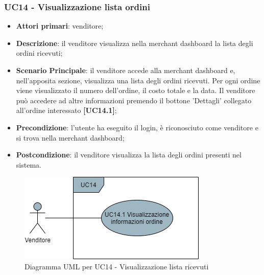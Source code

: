 \subsubsection{UC14 - Visualizzazione lista ordini}
\begin{itemize}
\item \textbf{Attori primari}: venditore;
\item \textbf{Descrizione}: il venditore visualizza nella merchant dashboard la lista degli ordini ricevuti;
\item \textbf{Scenario Principale}: il venditore accede alla merchant dashboard e, nell'apposita sezione, visualizza una lista degli ordini ricevuti. Per ogni ordine viene visualizzato il numero dell'ordine, il costo totale e la data. Il venditore può accedere ad altre informazioni premendo il bottone 'Dettagli' collegato all'ordine interessato \textbf{[UC14.1]};
\item \textbf{Precondizione}: l'utente ha eseguito il login, è riconosciuto come venditore e si trova nella merchant dashboard;
\item \textbf{Postcondizione}: il venditore visualizza la lista degli ordini presenti nel sistema.
\end{itemize}

\begin{figure}[H]
\centering
\includegraphics[scale=0.6]{res/UseCase/Immagini/VisualizzazioneOrdiniMerchant}
\caption{Diagramma UML per UC14 - Visualizzazione lista ricevuti}
\end{figure}

